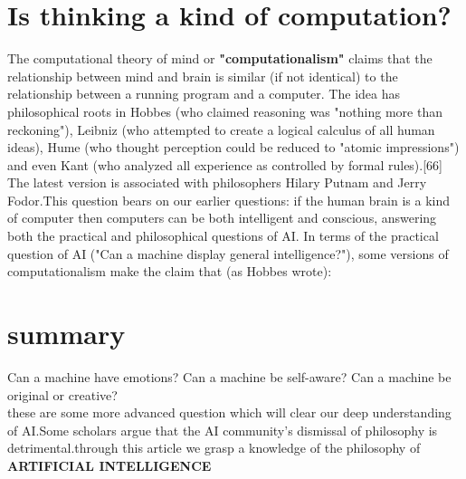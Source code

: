 \documentclass[12pt]{article}
\begin{document}
\section{Is thinking a kind of computation?}
The computational theory of mind or \textbf{"computationalism"} claims that the relationship between mind and brain is similar (if not identical) to the relationship between a running program and a computer. The idea has philosophical roots in Hobbes (who claimed reasoning was "nothing more than reckoning"), Leibniz (who attempted to create a logical calculus of all human ideas), Hume (who thought perception could be reduced to "atomic impressions") and even Kant (who analyzed all experience as controlled by formal rules).[66] The latest version is associated with philosophers Hilary Putnam and Jerry Fodor.This question bears on our earlier questions: if the human brain is a kind of computer then computers can be both intelligent and conscious, answering both the practical and philosophical questions of AI. In terms of the practical question of AI ("Can a machine display general intelligence?"), some versions of computationalism make the claim that (as Hobbes wrote):
\section{summary}
\small Can a machine have emotions?
Can a machine be self-aware?
Can a machine be original or creative?\\
these are some more advanced question which will clear our deep understanding of AI.Some scholars argue that the AI community's dismissal of philosophy is detrimental.through this article we grasp a knowledge of the philosophy of \textbf{ARTIFICIAL  INTELLIGENCE}
\end{document}
